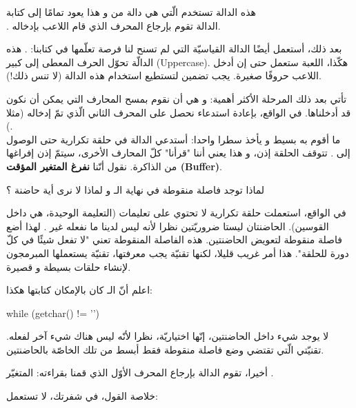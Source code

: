هذه الدالة تستخدم
الّتي هي دالة من
و هذا يعود تمامًا إلى كتابة\\
.
الدالة
تقوم بإرجاع المحرف الذي قام اللاعب بإدخاله.

بعد ذلك، أستعمل أيضًا الدالة القياسيّة التي لم تسنح لنا فرصة تعلّمها في كتابنا:
.
هذه الدالّة تحوّل الحرف المعطى إلى كبير
(\textenglish{Uppercase}).
هكّذا، اللعبة ستعمل حتى إن أدخل اللاعب حروفًا صغيرة. يجب تضمين
لتستطيع استخدام هذه الدالة (لا تنس ذلك!).

تأتي بعد ذلك المرحلة الأكثر أهمية: و هي أن نقوم بمسح المحارف التي يمكن أن نكون قد أدخلناها. في الواقع، بإعادة استدعاء
نحصل على المحرف الثاني الّذي تمّ إدخاله (مثلا
).\\
ما أقوم به بسيط و يأخذ سطرا واحدا: أستدعي الدالة
في حلقة تكرارية حتى الوصول إلى
.
تتوقف الحلقة إذن، و هذا يعني أننا "قرأنا" كلّ المحارف الأخرى، سيتمّ إذن إفراغها من الذاكرة. نقول أنّنا
\textbf{نفرغ المتغير المؤقت
(\textenglish{Buffer})}.

\begin{question}
لماذا توجد فاصلة منقوطة في نهاية الـ
و لماذا لا نرى أية حاضنة ؟
\end{question}

في الواقع، استعملت حلقة تكرارية لا تحتوي على تعليمات (التعليمة الوحيدة، هي
داخل القوسين). الحاضنتان ليستا ضروريّتين نظرا لأنه ليس لدينا ما نفعله غير
.
لهذا أضع فاصلة منقوطة لتعويض الحاضنتين. هذه الفاصلة المنقوطة تعني "لا تفعل شيئًا في كلّ دورة للحلقة". هذا أمر غريب قليلا، لكنها تقنيّة يجب معرفتها، تقنيّة يستعملها المبرمجون لإنشاء حلقات بسيطة و قصيرة.

اعلم أنّ الـ
كان بالإمكان كتابتها هكذا:

\begin{Csource}
while (getchar() != '\n')
{

}
\end{Csource}

لا يوجد شيء داخل الحاضنتين، إنّها اختياريّة، نظرا لأنّه ليس هناك شيء آخر لفعله. تقنيّتي الّتي تقتضي وضع فاصلة منقوطة فقط أبسط من تلك الخاصّة بالحاضنتين.

أخيرا، تقوم الدالة
بإرجاع المحرف الأوّل الذي قمنا بقراءته: المتغيّر
.

خلاصة القول، في شفرتك، لا تستعمل:

